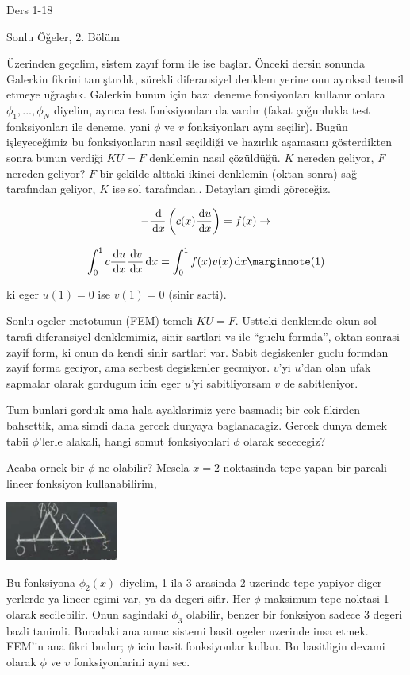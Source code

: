 \documentclass[12pt,fleqn]{article}\usepackage{../../common}
\begin{document}
Ders 1-18

Sonlu Öğeler, 2. Bölüm

Üzerinden geçelim, sistem zayıf form ile ise başlar. Önceki dersin sonunda
Galerkin fikrini tanıştırdık, sürekli diferansiyel denklem yerine onu ayrıksal
temsil etmeye uğraştık. Galerkin bunun için bazı deneme fonsiyonları kullanır
onlara $\phi_1,...,\phi_N$ diyelim, ayrıca test fonksiyonları da vardır (fakat
çoğunlukla test fonksiyonları ile deneme, yani $\phi$ ve $v$ fonksiyonları aynı
seçilir). Bugün işleyeceğimiz bu fonksiyonların nasıl seçildiği ve hazırlık
aşamasını gösterdikten sonra bunun verdiği $KU = F$ denklemin nasıl
çözüldüğü. $K$ nereden geliyor, $F$ nereden geliyor? $F$ bir şekilde alttaki
ikinci denklemin (oktan sonra) sağ tarafından geliyor, $K$ ise sol
tarafından.. Detayları şimdi göreceğiz.

$$
- \frac{\,\mathrm{d}}{\,\mathrm{d} x} \left( c(x) \frac{\,\mathrm{d} u}{\,\mathrm{d} x} \right) = f(x) \to
$$

$$
\int _{0}^{1} c \frac{\ud u}{\ud x} \frac{\ud v}{\ud x} \ud x =
\int _{0}^{1} f(x) v(x) \ud x
\mlabel{1}
$$

ki eger $u(1)=0$ ise $v(1) = 0$ (sinir sarti).

Sonlu ogeler metotunun (FEM) temeli $KU = F$. Ustteki denklemde okun sol tarafi
diferansiyel denklemimiz, sinir sartlari vs ile ``guclu formda'', oktan sonrasi
zayif form, ki onun da kendi sinir sartlari var. Sabit degiskenler guclu formdan
zayif forma geciyor, ama serbest degiskenler gecmiyor. $v$'yi $u$'dan olan ufak
sapmalar olarak gordugum icin eger $u$'yi sabitliyorsam $v$ de sabitleniyor.

Tum bunlari gorduk ama hala ayaklarimiz yere basmadi; bir cok fikirden
bahsettik, ama simdi daha gercek dunyaya baglanacagiz. Gercek dunya demek tabii
$\phi$'lerle alakali, hangi somut fonksiyonlari $\phi$ olarak sececegiz?

Acaba ornek bir $\phi$ ne olabilir? Mesela $x=2$ noktasinda tepe yapan bir
parcali lineer fonksiyon kullanabilirim,

\includegraphics[width=10em]{compscieng_1_18_01.png}

Bu fonksiyona $\phi_2(x)$ diyelim, 1 ila 3 arasinda 2 uzerinde tepe yapiyor
diger yerlerde ya lineer egimi var, ya da degeri sifir. Her $\phi$ maksimum tepe
noktasi 1 olarak secilebilir. Onun sagindaki $\phi_3$ olabilir, benzer bir
fonksiyon sadece 3 degeri bazli tanimli. Buradaki ana amac sistemi basit ogeler
uzerinde insa etmek. FEM'in ana fikri budur; $\phi$ icin basit fonksiyonlar
kullan. Bu basitligin devami olarak $\phi$ ve $v$ fonksiyonlarini ayni sec.
\end{document}

